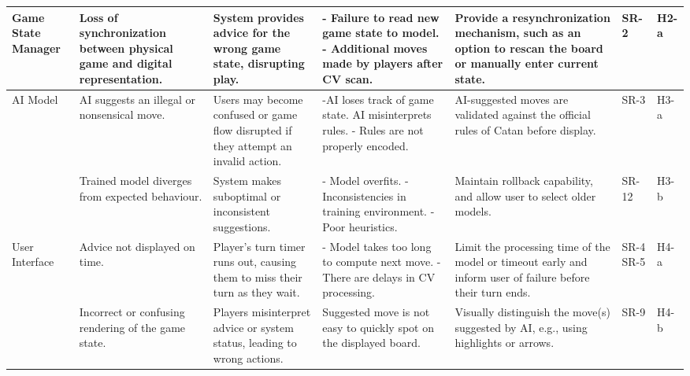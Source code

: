 \documentclass{article}
\begin{document}
\begin{landscape}
\begin{tabularx}{\linewidth}{|P{2.5cm}|Y|Y|Y|Y|P{1cm}|P{1cm}|}
        \hline

        Game State Manager &
        Loss of synchronization between physical game and digital representation. &
        System provides advice for the wrong game state, disrupting play. &
        - Failure to read new game state to model. \newline - Additional moves made by players after CV scan. &
        Provide a resynchronization mechanism, such as an option to rescan the board or manually enter current state. &
        SR-2 &
        H2-a \\

        \hline

        AI Model &
        AI suggests an illegal or nonsensical move. &
        Users may become confused or game flow disrupted if they attempt an invalid action. &
        -AI loses track of game state. \newline AI misinterprets rules. \newline - Rules are not properly encoded. &
        AI-suggested moves are validated against the official rules of Catan before display. &
        SR-3 &
        H3-a \\

        &
        Trained model diverges from expected behaviour. &
        System makes suboptimal or inconsistent suggestions. &
        - Model overfits. \newline - Inconsistencies in training environment. \newline - Poor heuristics. &
        Maintain rollback capability, and allow user to select older models. &
        SR-12 &
        H3-b \\


        \hline

        User Interface &
        Advice not displayed on time. &
        Player's turn timer runs out, causing them to miss their turn as they wait. &
        - Model takes too long to compute next move. \newline - There are delays in CV processing. &
        Limit the processing time of the model or timeout early and inform user of failure before their turn ends. &
        SR-4 \newline SR-5 &
        H4-a \\

        &
        Incorrect or confusing rendering of the game state. &
        Players misinterpret advice or system status, leading to wrong actions. &
        Suggested move is not easy to quickly spot on the displayed board. &
        Visually distinguish the move(s) suggested by AI, e.g., using highlights or arrows. &
        SR-9 &
        H4-b \\


\end{tabularx}
\end{landscape}
\end{document}

